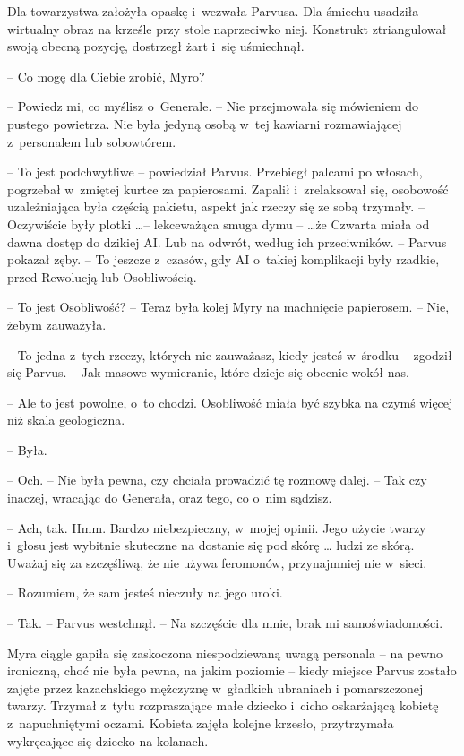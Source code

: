 \documentclass[oneside,polish,11pt,sfheadings]{mwbk}
\begin{document}
Dla towarzystwa założyła opaskę i~wezwała Parvusa. Dla śmiechu usadziła
wirtualny obraz na krześle przy stole naprzeciwko niej. Konstrukt
ztriangulował swoją obecną pozycję, dostrzegł żart i~się uśmiechnął.

-- Co mogę dla Ciebie zrobić, Myro?

-- Powiedz mi, co myślisz o~Generale. -- Nie przejmowała się mówieniem do
pustego powietrza. Nie była jedyną osobą w~tej kawiarni rozmawiającej z~personalem lub sobowtórem.

-- To jest podchwytliwe -- powiedział Parvus. Przebiegł palcami po
włosach, pogrzebał w~zmiętej kurtce za papierosami. Zapalił i~zrelaksował się, osobowość uzależniająca była częścią pakietu, aspekt
jak rzeczy się ze sobą trzymały. -- Oczywiście były plotki \ldots -- lekceważąca smuga dymu -- \ldots że Czwarta miała od dawna dostęp do dzikiej
AI. Lub na odwrót, według ich przeciwników. -- Parvus pokazał zęby. -- To
jeszcze z~czasów, gdy AI o~takiej komplikacji były rzadkie, przed
Rewolucją lub Osobliwością.

-- To jest Osobliwość? -- Teraz była kolej Myry na machnięcie papierosem.
-- Nie, żebym zauważyła.

-- To jedna z~tych rzeczy, których nie zauważasz, kiedy jesteś w~środku -- zgodził się Parvus. -- Jak masowe wymieranie, które dzieje się obecnie
wokół nas.

-- Ale to jest powolne, o~to chodzi. Osobliwość miała być szybka na czymś
więcej niż skala geologiczna.

-- Była.

-- Och. -- Nie była pewna, czy chciała prowadzić tę rozmowę dalej. -- Tak
czy inaczej, wracając do Generała, oraz tego, co o~nim sądzisz.

-- Ach, tak. Hmm. Bardzo niebezpieczny, w~mojej opinii. Jego użycie
twarzy i~głosu jest wybitnie skuteczne na dostanie się pod skórę \ldots
ludzi ze skórą. Uważaj się za szczęśliwą, że nie używa feromonów,
przynajmniej nie w~sieci.

-- Rozumiem, że sam jesteś nieczuły na jego uroki.

-- Tak. -- Parvus westchnął. -- Na szczęście dla mnie, brak mi
samoświadomości.

Myra ciągle gapiła się zaskoczona niespodziewaną uwagą personala -- na
pewno ironiczną, choć nie była pewna, na jakim poziomie -- kiedy miejsce
Parvus zostało zajęte przez kazachskiego mężczyznę w~gładkich ubraniach
i pomarszczonej twarzy. Trzymał z~tyłu rozpraszające małe dziecko i~cicho oskarżającą kobietę z~napuchniętymi oczami. Kobieta zajęła kolejne
krzesło, przytrzymała wykręcające się dziecko na kolanach.
\end{document}
